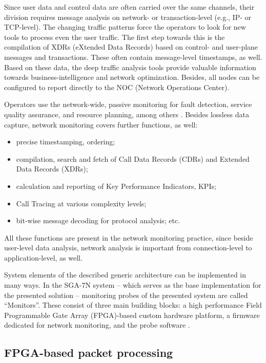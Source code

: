 \documentclass[journal]{IEEEtran}
\begin{document}
Since user data and control data are often carried over the same channels, their division requires message analysis on network- or transaction-level (e.g., IP- or TCP-level). The changing traffic patterns force the operators to look for new tools to process even the user traffic. The first step towards this is the compilation of XDRs (eXtended Data Records) based on control- and user-plane messages and transactions. These often contain message-level timestamps, as well. Based on these data, the deep traffic analysis tools provide valuable information towards business-intelligence and network optimization. Besides, all nodes can be configured to report directly to the NOC (Network Operations Center).

Operators use the network-wide, passive monitoring for fault detection, service quality assurance, and resource planning, among others \cite{LTE_monitoring}. Besides lossless data capture, network monitoring covers further functions, as well:
\begin{itemize}
\renewcommand\labelitemi{--}
\item precise timestamping, ordering;
\item compilation, search and fetch of Call Data Records (CDRs) and Extended Data Records (XDRs);
\item calculation and reporting of Key Performance Indicators, KPIs;
\item Call Tracing at various complexity levels;
\item bit-wise message decoding for protocol analysis; etc. 
\end{itemize}

All these functions are present in the network monitoring practice, since beside user-level data analysis, network analysis is important from connection-level to application-level, as well.

System elements of the described generic architecture can be implemented in many ways. In the SGA-7N system -- which serves as the base implementation for the presented solution --  monitoring probes of the presented system are called ``Monitors''. These consist of three main building blocks: a high performance Field Programmable Gate Array (FPGA)-based custom hardware platform, a firmware dedicated for network monitoring, and the probe software \cite{AITIA_SGA7N}.

\subsection{FPGA-based packet processing}
\end{document}
